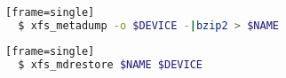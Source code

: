 \documentclass[
  color, %
  table, %
  lof,   %
  lot,   %
]{fithesis3}
\begin{document}
\begin{lstlisting}[language=bash, caption={Creating compressed image using xfs\_metadump}][frame=single]
  $ xfs_metadump -o $DEVICE -|bzip2 > $NAME
\end{lstlisting}

\begin{lstlisting}[language=bash, caption={Reloading image using xfs\_mdrestore}][frame=single]
  $ xfs_mdrestore $NAME $DEVICE
\end{lstlisting}





\end{document}
